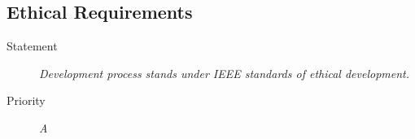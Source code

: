 \subsection{Ethical Requirements}
\NFR
\begin{description}
\item[Statement] \textit{Development process stands under IEEE standards of
    ethical development.}
\item[Priority] \textit{A}
\end{description}